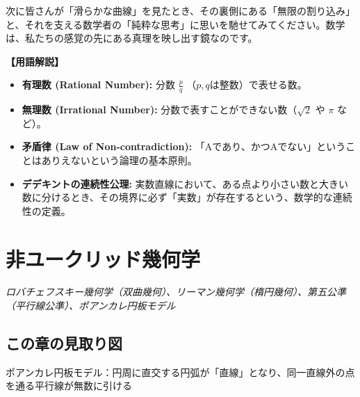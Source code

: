 \documentclass[a4paper,11pt,openany]{ltjsbook}
\begin{document}
\begin{lecturebox}
次に皆さんが「滑らかな曲線」を見たとき、その裏側にある「無限の割り込み」と、それを支える数学者の「純粋な思考」に思いを馳せてみてください。数学は、私たちの感覚の先にある真理を映し出す鏡なのです。

\textbf{【用語解説】}
\begin{itemize}[leftmargin=2em]
\item \textbf{有理数 (Rational Number):} 分数 $\frac{p}{q}$ （$p, q$は整数）で表せる数。
\item \textbf{無理数 (Irrational Number):} 分数で表すことができない数（$\sqrt{2}$ や $\pi$ など）。
\item \textbf{矛盾律 (Law of Non-contradiction):} 「Aであり、かつAでない」ということはありえないという論理の基本原則。
\item \textbf{デデキントの連続性公理:} 実数直線において、ある点より小さい数と大きい数に分けるとき、その境界に必ず「実数」が存在するという、数学的な連続性の定義。
\end{itemize}
\end{lecturebox}


\clearpage
\chapter{非ユークリッド幾何学}
\begin{center}\large\textit{ロバチェフスキー幾何学（双曲幾何）、リーマン幾何学（楕円幾何）、第五公準（平行線公準）、ポアンカレ円板モデル}\end{center}

\section*{この章の見取り図}
\begin{center}


\small ポアンカレ円板モデル：円周に直交する円弧が「直線」となり、同一直線外の点を通る平行線が無数に引ける
\end{center}
\end{document}
